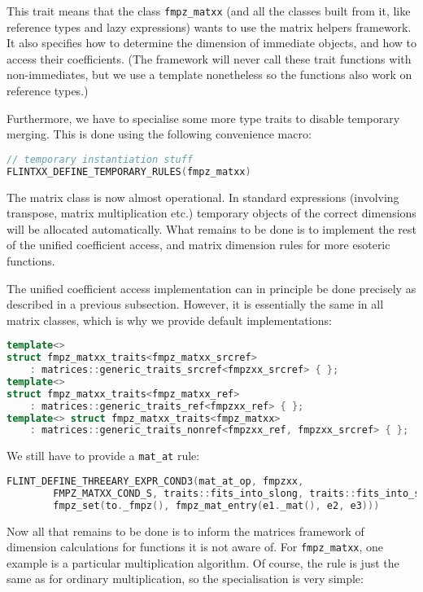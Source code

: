 \documentclass[a4paper,10pt]{book}
\newcommand{\code}{\lstinline}
\begin{document}
{{This trait means that the class \code{fmpz_matxx} (and all the classes built
from it, like reference types and lazy expressions) wants to use the matrix
helpers framework. It also specifies how to determine the dimension of immediate
objects, and how to access their coefficients. (The framework will never call
these trait functions with non-immediates, but we use a template nonetheless so
the functions also work on reference types.)

Furthermore, we have to specialise some more type traits to disable temporary
merging. This is done using the following convenience macro:

\begin{lstlisting}[language=c++]
// temporary instantiation stuff
FLINTXX_DEFINE_TEMPORARY_RULES(fmpz_matxx)
\end{lstlisting}

The matrix class is now almost operational. In standard expressions (involving
transpose, matrix multiplication etc.) temporary objects of the correct dimensions
will be allocated automatically. What remains to be done is to implement the rest of
the unified coefficient access, and matrix dimension rules for more esoteric
functions.

The unified coefficient access implementation can in principle be done precisely
as described in a previous subsection.
However, it is essentially the same in all matrix classes,
which is why we provide default implementations:

\begin{lstlisting}[language=c++]
template<>
struct fmpz_matxx_traits<fmpz_matxx_srcref>
    : matrices::generic_traits_srcref<fmpzxx_srcref> { };
template<>
struct fmpz_matxx_traits<fmpz_matxx_ref>
    : matrices::generic_traits_ref<fmpzxx_ref> { };
template<> struct fmpz_matxx_traits<fmpz_matxx>
    : matrices::generic_traits_nonref<fmpzxx_ref, fmpzxx_srcref> { };
\end{lstlisting}

We still have to provide a \code{mat_at} rule:

\begin{lstlisting}[language=c++]
FLINT_DEFINE_THREEARY_EXPR_COND3(mat_at_op, fmpzxx,
        FMPZ_MATXX_COND_S, traits::fits_into_slong, traits::fits_into_slong,
        fmpz_set(to._fmpz(), fmpz_mat_entry(e1._mat(), e2, e3)))
\end{lstlisting}

Now all that remains to be done is to inform the matrices framework of dimension
calculations for functions it is not aware of. For \code{fmpz_matxx}, one
example is a particular multiplication algorithm. Of course, the rule is just
the same as for ordinary multiplication, so the specialisation is very simple:

}}
\end{document}
